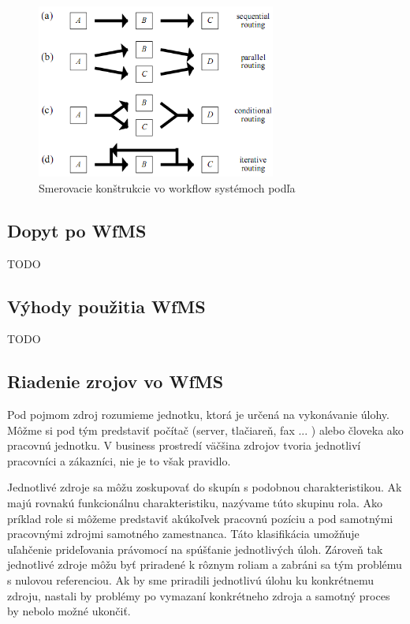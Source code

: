 \begin{figure}[h]
	\centerline{\includegraphics[width=0.7\textwidth]{images/smerovacie_konstrukcie}}
	\caption[smerovacie konštrukcie]{Smerovacie konštrukcie vo workflow systémoch podľa \cite{workflow_systemy}}
	\label{obr:cursus}
\end{figure}



\subsection{Dopyt po WfMS}
TODO

\subsection{Výhody použitia WfMS}
TODO

\subsection{Riadenie zrojov vo WfMS}
Pod pojmom zdroj rozumieme jednotku, ktorá je určená na vykonávanie úlohy. Môžme si pod tým predstaviť počítač (server, tlačiareň, fax ... ) alebo človeka ako pracovnú jednotku. V business prostredí väčšina zdrojov tvoria jednotliví pracovníci a zákazníci, nie je to však pravidlo.

Jednotlivé zdroje sa môžu zoskupovať do skupín s podobnou charakteristikou. Ak majú rovnakú funkcionálnu charakteristiku, nazývame túto skupinu rola.
Ako príklad role si môžeme predstaviť akúkoľvek pracovnú pozíciu a pod samotnými pracovnými zdrojmi samotného zamestnanca. Táto klasifikácia umožňuje uľahčenie prideľovania právomocí na spúšťanie jednotlivých úloh. Zároveň tak jednotlivé zdroje môžu byť priradené k rôznym roliam a zabráni sa tým problému s nulovou referenciou. Ak by sme priradili jednotlivú úlohu ku konkrétnemu zdroju, nastali by problémy po vymazaní konkrétneho zdroja a samotný proces by nebolo možné ukončiť.

